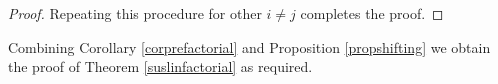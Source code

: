 \documentclass[12pt]{report}
\numberwithin{equation}{section}
\newcounter{dummy} \numberwithin{dummy}{section}
\newtheorem{definition}[dummy]{Definition}
\newtheorem{proposition}[dummy]{Proposition}
\begin{document}
\begin{proof}
		Repeating this procedure for other $i \neq j $ completes the proof.	
  \end{proof}
	
	
	Combining Corollary \ref{corprefactorial} and Proposition \ref{propshifting} we obtain the proof of Theorem \ref{suslinfactorial} as required.
	
%	
%	
%	
%	
%	
\end{document}
